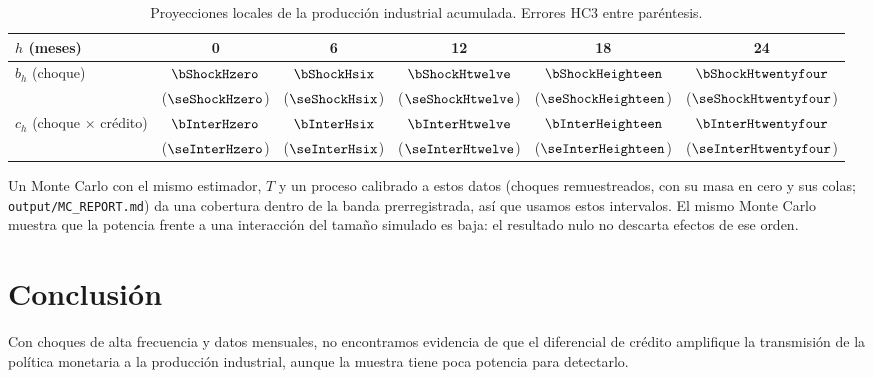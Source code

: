 \documentclass[11pt]{article}
\begin{document}
\begin{table}[h]
\centering
\begin{tabular}{lccccc}
\toprule
$h$ (meses) & 0 & 6 & 12 & 18 & 24 \\
\midrule
$b_h$ (choque) & $\bShockHzero$ & $\bShockHsix$ & $\bShockHtwelve$ & $\bShockHeighteen$ & $\bShockHtwentyfour$ \\
 & ($\seShockHzero$) & ($\seShockHsix$) & ($\seShockHtwelve$) & ($\seShockHeighteen$) & ($\seShockHtwentyfour$) \\
$c_h$ (choque $\times$ crédito) & $\bInterHzero$ & $\bInterHsix$ & $\bInterHtwelve$ & $\bInterHeighteen$ & $\bInterHtwentyfour$ \\
 & ($\seInterHzero$) & ($\seInterHsix$) & ($\seInterHtwelve$) & ($\seInterHeighteen$) & ($\seInterHtwentyfour$) \\
\bottomrule
\end{tabular}
\caption{Proyecciones locales de la producción industrial acumulada. Errores HC3 entre paréntesis.}
\end{table}

Un Monte Carlo con el mismo estimador, $T$ y un proceso calibrado a estos datos (choques remuestreados, con su masa en
cero y sus colas; \texttt{output/MC\_REPORT.md}) da una cobertura dentro de la banda prerregistrada, así que usamos estos
intervalos. El mismo Monte Carlo muestra que la potencia frente a una interacción del tamaño simulado es baja: el
resultado nulo no descarta efectos de ese orden.

\section{Conclusión}
Con choques de alta frecuencia y datos mensuales, no encontramos evidencia de que el diferencial de crédito amplifique la
transmisión de la política monetaria a la producción industrial, aunque la muestra tiene poca potencia para detectarlo.
\end{document}
